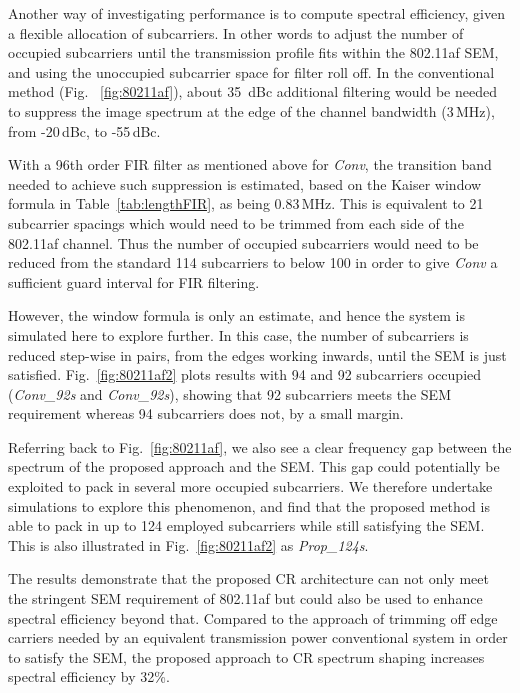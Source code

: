Another way of investigating performance is to compute spectral efficiency, given a flexible allocation of subcarriers.
In other words to adjust the number of occupied subcarriers until the transmission profile fits within the 802.11af SEM, and using the unoccupied subcarrier space for filter roll off.
In the conventional method (Fig. ~\ref{fig:80211af}), about 35~dBc additional filtering would be needed to suppress the image spectrum at the edge of the channel bandwidth (3\,MHz), from -20\,dBc, to -55\,dBc.

With a 96th order FIR filter as mentioned above for \emph{Conv}, the transition band needed to achieve such suppression is estimated, based on the Kaiser window formula in Table~\ref{tab:lengthFIR}, as being 0.83\,MHz.
This is equivalent to 21 subcarrier spacings which would need to be trimmed from each side of the 802.11af channel.
Thus the number of occupied subcarriers would need to be reduced from the standard 114 subcarriers to below 100 in order to give \emph{Conv} a sufficient guard interval for FIR filtering.

However, the window formula is only an estimate, and hence the system is simulated here to explore further.
In this case, the number of subcarriers is reduced step-wise in pairs, from the edges working inwards, until the SEM is just satisfied.
Fig.~\ref{fig:80211af2} plots results with 94 and 92 subcarriers occupied (\emph{Conv\_92s} and \emph{Conv\_92s}), showing that 92 subcarriers meets the SEM requirement whereas 94 subcarriers does not, by a small margin.

Referring back to Fig.~\ref{fig:80211af}, we also see a clear frequency gap between the spectrum of the proposed approach and the SEM.
This gap could potentially be exploited to pack in several more occupied subcarriers.
We therefore undertake simulations to explore this phenomenon, and find that the proposed method is able to pack in up to 124 employed subcarriers while still satisfying the SEM.
This is also illustrated in Fig.~\ref{fig:80211af2} as \emph{Prop\_124s}.

The results demonstrate that the proposed CR architecture can not only meet the stringent SEM requirement of 802.11af but could also be used to enhance spectral efficiency beyond that.
Compared to the approach of trimming off edge carriers needed by an equivalent transmission power conventional system in order to satisfy the SEM, the proposed approach to CR spectrum shaping increases spectral efficiency by 32\%.


